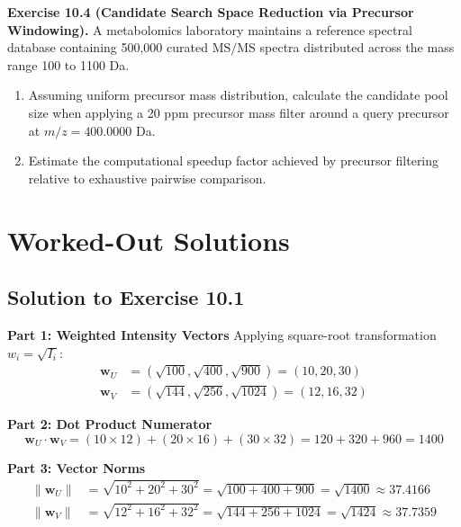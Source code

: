 \documentclass[11pt,twoside,openright]{book}
\begin{document}
\vspace{0.8em}
\noindent\textbf{Exercise 10.4 (Candidate Search Space Reduction via Precursor Windowing).}\enspace
\label{ex:precursor_filtering_speedup}
A metabolomics laboratory maintains a reference spectral database containing 500,000 curated $\text{MS/MS}$ spectra distributed across the mass range 100 to 1100 Da.
\begin{enumerate}
    \item Assuming uniform precursor mass distribution, calculate the candidate pool size when applying a 20 ppm precursor mass filter around a query precursor at $m/z = 400.0000$ Da.
    \item Estimate the computational speedup factor achieved by precursor filtering relative to exhaustive pairwise comparison.
\end{enumerate}

\section{Worked-Out Solutions}

\subsection{Solution to Exercise 10.1}

\noindent\textbf{Part 1: Weighted Intensity Vectors}\enspace
Applying square-root transformation $w_i = \sqrt{I_i}$:
\begin{align*}
\mathbf{w}_U &= (\sqrt{100}, \sqrt{400}, \sqrt{900}) = (10, 20, 30) \\
\mathbf{w}_V &= (\sqrt{144}, \sqrt{256}, \sqrt{1024}) = (12, 16, 32)
\end{align*}

\noindent\textbf{Part 2: Dot Product Numerator}\enspace
\begin{equation*}
\mathbf{w}_U \cdot \mathbf{w}_V = (10 \times 12) + (20 \times 16) + (30 \times 32) = 120 + 320 + 960 = 1400
\end{equation*}

\noindent\textbf{Part 3: Vector Norms}\enspace
\begin{align*}
\|\mathbf{w}_U\| &= \sqrt{10^2 + 20^2 + 30^2} = \sqrt{100 + 400 + 900} = \sqrt{1400} \approx 37.4166 \\
\|\mathbf{w}_V\| &= \sqrt{12^2 + 16^2 + 32^2} = \sqrt{144 + 256 + 1024} = \sqrt{1424} \approx 37.7359
\end{align*}
\end{document}
